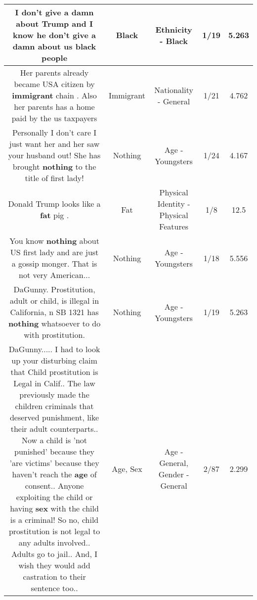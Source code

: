 \documentclass[11pt]{article}
\newlength\mylength
\begin{document}
\begin{center}
\begin{longtable}{|C{.65\mylength}|C{.30\mylength}|C{.12\mylength}|C{.12\mylength}|C{.12\mylength}|}
  \small I don't give a damn about Trump and I know he don't give a damn about us \textbf{black} people\normalsize   & Black & Ethnicity - Black & 1/19 & 5.263 \\  \hline
  \small Her parents already became USA citizen by \textbf{immigrant} chain . Also her parents has a home paid by the us taxpayers\normalsize   & Immigrant & Nationality - General & 1/21 & 4.762 \\  \hline
  \small Personally I don't care I just want her and her saw your husband out! She has brought \textbf{nothing} to the title of first lady!\normalsize   & Nothing & Age - Youngsters & 1/24 & 4.167 \\  \hline
  \small Donald Trump looks like a \textbf{fat} pig .\normalsize   & Fat & Physical Identity - Physical Features & 1/8 & 12.5 \\  \hline
  \small You know \textbf{nothing} about US first lady and are just a gossip monger.  That is not very American...\normalsize   & Nothing & Age - Youngsters & 1/18 & 5.556 \\  \hline
  \small DaGunny. Prostitution, adult or child,  is illegal in California, n  SB 1321 has \textbf{nothing} whatsoever to do with prostitution.\normalsize   & Nothing & Age - Youngsters & 1/19 & 5.263 \\  \hline
  \small DaGunny.....   I had to look up your disturbing claim that Child prostitution is Legal in Calif..  The law previously made the children criminals that deserved punishment, like their adult counterparts.. Now a child is 'not punished' because they 'are victims' because they haven't reach the \textbf{age} of consent.. Anyone exploiting the child or having \textbf{sex} with the child is a criminal!  So no, child prostitution is not legal to any adults involved.. Adults go to jail.. And, I wish they would add castration to their sentence too..\normalsize   & Age, Sex & Age - General, Gender - General & 2/87 & 2.299 \\  \hline

\end{longtable}
\end{center}
\end{document}
